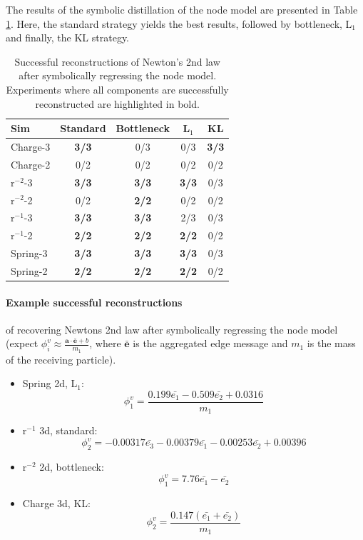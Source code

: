 \documentclass[11pt]{article}
\begin{document}
    The results of the symbolic distillation of the node model are presented in Table \ref{tab:sr_edge_model_table}. Here, the standard strategy yields the best results, followed by bottleneck, L$_1$  and finally, the KL strategy.
    \begin{table}[H]
        \centering
        \begin{tabular}{lcccc}
        \hline
        Sim & Standard & Bottleneck & L$_1$ & KL \\
        \hline
        Charge-3 & \textbf{3/3} & 0/3 & 0/3 & \textbf{3/3} \\
        Charge-2 & 0/2 & 0/2 & 0/2 & 0/2 \\
        r$^{-2}$-3 & \textbf{3/3} & \textbf{3/3} & \textbf{3/3} & 0/3 \\
        r$^{-2}$-2 & 0/2 & \textbf{2/2} & 0/2 & 0/2 \\
        r$^{-1}$-3 & \textbf{3/3} & \textbf{3/3} & 2/3 & 0/3 \\
        r$^{-1}$-2 & \textbf{2/2} & \textbf{2/2} & \textbf{2/2} & 0/2 \\
        Spring-3 & \textbf{3/3} & \textbf{3/3} & \textbf{3/3}  & 0/3 \\
        Spring-2 & \textbf{2/2} & \textbf{2/2} & \textbf{2/2} & 0/2 \\
        \hline
        \end{tabular}
        \caption{Successful reconstructions of Newton's 2nd law after symbolically regressing the node model. Experiments where all components are successfully reconstructed are highlighted in bold.}
        \label{tab:sr_edge_model_table}
    \end{table}


\paragraph*{Example successful reconstructions} of recovering Newtons 2nd law after symbolically regressing the node model (expect $\phi^{v}_i \approx \frac{\mathbf{a} \cdot \mathbf{\bar{e}} + b}{m_1}$, where $\mathbf{\bar{e}}$ is the aggregated edge message and $m_1$ is the mass of the receiving particle).
\begin{itemize}
        \item
        Spring 2d, L$_1$:
        $$
        \phi^{v}_1 = \frac{0.199\bar{e_1} - 0.509\bar{e_2} + 0.0316}{m_1}$$
        \item
        r$^{-1}$ 3d, standard:
        $$
        \phi^{v}_2 = -0.00317\bar{e_3} - 0.00379\bar{e_1} - 0.00253\bar{e_2} + 0.00396
        $$
        \item
        r$^{-2}$ 2d, bottleneck:
        $$
        \phi^{v}_1 = 7.76\bar{e_1} - \bar{e_2}
        $$
        \item
        Charge 3d, KL:
        $$
        \phi^{v}_2 = \frac{0.147(\bar{e_1} + \bar{e_2})}{m_1}
        $$
    \end{itemize}
\end{document}
